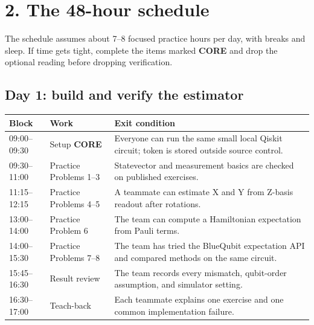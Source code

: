 \documentclass[11pt,letterpaper]{article}
\begin{document}
\section*{2. The 48-hour schedule}
The schedule assumes about 7--8 focused practice hours per day, with breaks and sleep. If time gets tight, complete the items marked \textbf{CORE} and drop the optional reading before dropping verification.

\subsection*{Day 1: build and verify the estimator}
\begin{tabularx}{\linewidth}{@{}p{0.91in}p{1.43in}X@{}}
\toprule
\textbf{Block} & \textbf{Work} & \textbf{Exit condition}\\
\midrule
09:00--09:30 & Setup \textbf{CORE} & Everyone can run the same small local Qiskit circuit; token is stored outside source control.\\
09:30--11:00 & Practice Problems 1--3 & Statevector and measurement basics are checked on published exercises.\\
11:15--12:15 & Practice Problems 4--5 & A teammate can estimate X and Y from Z-basis readout after rotations.\\
13:00--14:00 & Practice Problem 6 & The team can compute a Hamiltonian expectation from Pauli terms.\\
14:00--15:30 & Practice Problems 7--8 & The team has tried the BlueQubit expectation API and compared methods on the same circuit.\\
15:45--16:30 & Result review & The team records every mismatch, qubit-order assumption, and simulator setting.\\
16:30--17:00 & Teach-back & Each teammate explains one exercise and one common implementation failure.\\
\bottomrule
\end{tabularx}
\end{document}
